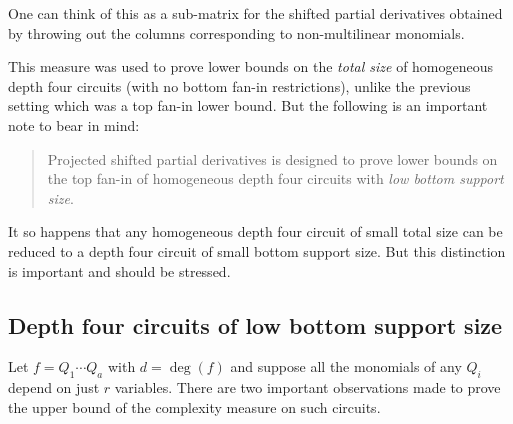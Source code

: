 
One can think of this as a sub-matrix for the shifted partial derivatives obtained by throwing out the columns corresponding to non-multilinear monomials.

This measure was used to prove lower bounds on the \emph{total size} of homogeneous depth four circuits (with no bottom fan-in restrictions), unlike the previous setting which was a top fan-in lower bound. But the following is an important note to bear in mind:
\begin{quote}
Projected shifted partial derivatives is designed to prove lower bounds on the top fan-in of homogeneous depth four circuits with \emph{low bottom support size}. 
\end{quote}
It so happens that any homogeneous depth four circuit of small total size can be reduced to a depth four circuit of small bottom support size. But this distinction is important and should be stressed. 

\subsection{Depth four circuits of low bottom support size}

Let $f = Q_1 \cdots Q_a$ with $d = \deg(f)$ and suppose all the monomials of any $Q_i$ depend on just $r$ variables.
There are two important observations made to prove the upper bound of the complexity measure on such circuits.

